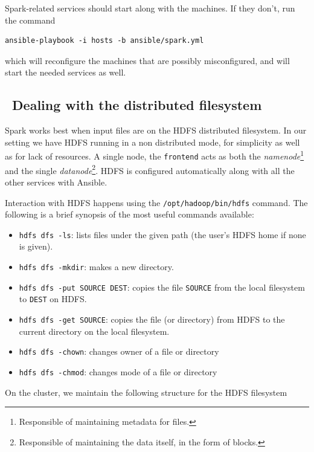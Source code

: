 \documentclass[justified]{tufte-handout}
\providecommand{\tightlist}{%
  \setlength{\itemsep}{0pt}\setlength{\parskip}{0pt}}
\begin{document}
Spark-related services should start along with the machines. If they
don't, run the command

\begin{verbatim}
ansible-playbook -i hosts -b ansible/spark.yml
\end{verbatim}

\noindent
which will reconfigure the machines that are possibly misconfigured, and
will start the needed services as well.

\subsection{~Dealing with the distributed
filesystem}\label{dealing-with-the-distributed-filesystem}

Spark works best when input files are on the HDFS distributed
filesystem. In our setting we have HDFS running in a non distributed
mode, for simplicity as well as for lack of resources. A single node,
the \texttt{frontend} acts as both the \emph{namenode}\footnote{Responsible
  of maintaining metadata for files.} and the single
\emph{datanode}\footnote{Responsible of maintaining the data itself, in
  the form of blocks.}. HDFS is configured automatically along with all
the other services with Ansible.

Interaction with HDFS happens using the \texttt{/opt/hadoop/bin/hdfs}
command. The following is a brief synopsis of the most useful commands
available:

\begin{itemize}
\tightlist
\item
  \texttt{hdfs\ dfs\ -ls}: lists files under the given path (the user's
  HDFS home if none is given).
\item
  \texttt{hdfs\ dfs\ -mkdir}: makes a new directory.
\item
  \texttt{hdfs\ dfs\ -put\ SOURCE\ DEST}: copies the file
  \texttt{SOURCE} from the local filesystem to \texttt{DEST} on HDFS.
\item
  \texttt{hdfs\ dfs\ -get\ SOURCE}: copies the file (or directory) from
  HDFS to the current directory on the local filesystem.
\item
  \texttt{hdfs\ dfs\ -chown}: changes owner of a file or directory
\item
  \texttt{hdfs\ dfs\ -chmod}: changes mode of a file or directory
\end{itemize}

On the cluster, we maintain the following structure for the HDFS
filesystem
\end{document}
